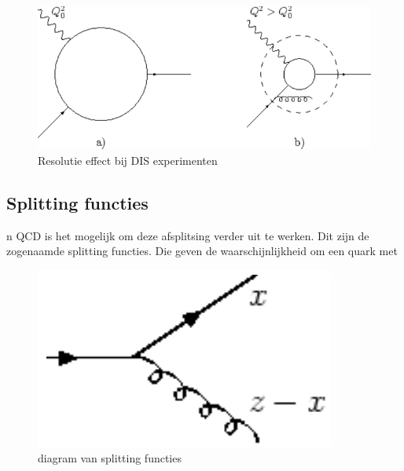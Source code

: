 \documentclass[../main.tex]{subfiles}
\begin{document}
\begin{figure}[h]
    \centering
    \includegraphics[width=0.8\linewidth]{QCD/resolutie.png}
    \caption{Resolutie effect bij DIS experimenten}%
    \label{fig:dis_resolutie}
\end{figure}

\subsection{Splitting functies}%
\label{sub:splitting_functies}

n QCD is het mogelijk om deze afsplitsing verder uit te werken. Dit zijn de zogenaamde splitting functies. Die geven de waarschijnlijkheid om een quark met

\begin{figure}
    \centering
    \includegraphics[width=0.9\linewidth]{QCD/split_func.png}
    \caption{diagram van splitting functies}
    \label{fig:split_func}
\end{figure}\noindent
\end{document}
